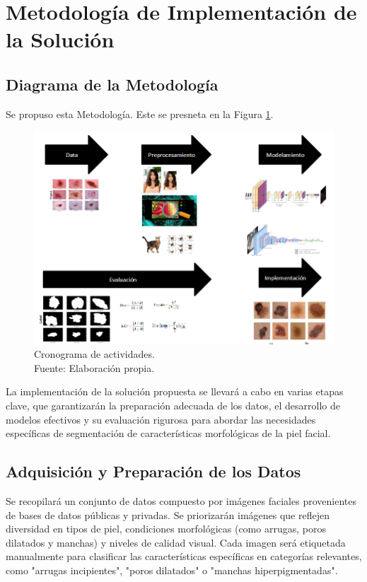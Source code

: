 \section{Metodología de Implementación de la Solución}
\begin{landscape}
	\section{Diagrama de la Metodología}
	Se propuso esta Metodología. Este se presneta en la Figura \ref{3:fig303}.

	\begin{figure}[!ht]
		\begin{center}
			\includegraphics[width=1.50\textwidth]{3/figures/metodologia.png}
			\caption[Cronograma de actividades]{Cronograma de actividades.\\
				Fuente: Elaboración propia.}
			\label{3:fig303}
		\end{center}
	\end{figure}
	
\end{landscape}




La implementación de la solución propuesta se llevará a cabo en varias etapas clave, que garantizarán la preparación adecuada de los datos, el desarrollo de modelos efectivos y su evaluación rigurosa para abordar las necesidades específicas de segmentación de características morfológicas de la piel facial.

\subsection{Adquisición y Preparación de los Datos}
Se recopilará un conjunto de datos compuesto por imágenes faciales provenientes de bases de datos públicas y privadas. Se priorizarán imágenes que reflejen diversidad en tipos de piel, condiciones morfológicas (como arrugas, poros dilatados y manchas) y niveles de calidad visual. Cada imagen será etiquetada manualmente para clasificar las características específicas en categorías relevantes, como "arrugas incipientes", "poros dilatados" o "manchas hiperpigmentadas".

